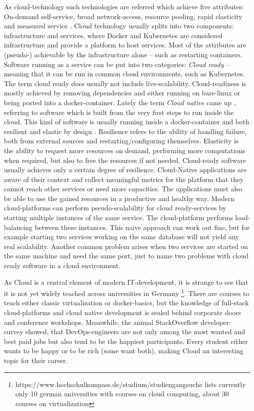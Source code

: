 \documentclass[english,utf8]{lni}
\begin{document}
As cloud-technology such technologies are referred which achieve five attributes: 
On-demand self-service, broad network-access, resource pooling, rapid elasticity and measured service \cite{ME11}. 
Cloud technology usually splits into two components:  infrastructure  and  services,  where  Docker and Kubernetes are considered infrastructure and provide a  platform  to  host  services.  
Most  of  the  attributes  are (pseudo-) achievable by the infrastructure alone – such as restarting containers. 
Software running as a service can be put into two categories: 
\textit{Cloud ready} – meaning that it can be run in common cloud environments, such as Kubernetes. 
The term cloud ready  does  usually  not  include  live-scalability. Cloud-readiness is mostly achieved by removing dependencies and either running on bare-linux or being ported into a docker-container. 
Lately the term \textit{Cloud native} came up \cite{BI17}, referring to software which is built from the very first steps to run inside the cloud. This kind of software is usually running inside a docker-container and both resilient and elastic by design \cite{TO17}.  
Resilience refers to the ability of handling failure, both from external sources and restarting/configuring themselves.  
Elasticity is the ability to request more resources on demand, performing more computations when required, but also to free the resources if not needed. 
Cloud-ready software usually achieves only a certain degree of resilience.   
Cloud-Native applications are aware of their context and collect meaningful metrics for the platform that they cannot reach other services or need more capacities. 
The applications must also be able to use the gained resources in a productive and healthy way.  
Modern  cloud-platforms  can  perform  pseudo-scalability for cloud ready-services by starting multiple instances of the same service. 
The cloud-platform performs load-balancing between these instances. 
This naive approach can work out fine, but for example starting two services working on the same database will not yield any real scalability. 
Another common problem arises when two services are started on the same machine and need the same port, just to name two problems with cloud ready  software in a cloud environment. 

As Cloud is a central element of modern IT-development, it is strange to see that it is not yet widely teached across 
universities in Germany \footnote{https://www.hochschulkompass.de/studium/studiengangsuche lists currently only 10 german universities with courses on cloud computing, about 30 courses on virtualization }.
There are courses to teach either classic virtualization or docker-basics, but the knowledge of full-stack cloud-platforms and cloud native development is sealed behind corporate doors and conference workshops.
Meanwhile,  the  annual  StackOverflow  developer-survey \cite{SO19} showed, that DevOps-engineers are not only 
among the most wanted and best paid jobs but also tend to be the happiest participants.  
Every student either wants to be happy or to be rich (some want both), making Cloud an interesting topic for their career. 
\end{document}
